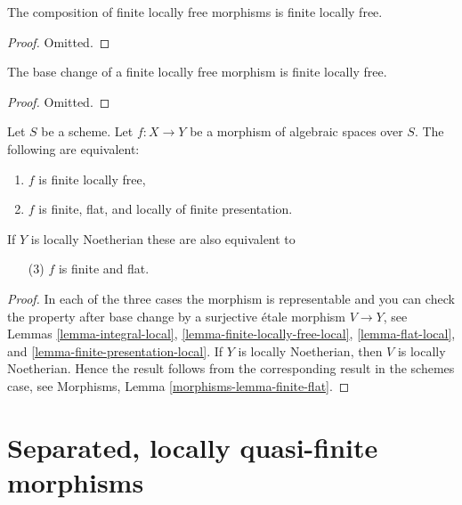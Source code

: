 \begin{lemma}
\label{lemma-composition-finite-locally-free}
The composition of finite locally free morphisms is finite locally free.
\end{lemma}

\begin{proof}
Omitted.
\end{proof}

\begin{lemma}
\label{lemma-base-change-finite-locally-free}
The base change of a finite locally free morphism is finite locally free.
\end{lemma}

\begin{proof}
Omitted.
\end{proof}

\begin{lemma}
\label{lemma-finite-flat}
Let $S$ be a scheme.
Let $f : X \to Y$ be a morphism of algebraic spaces over $S$.
The following are equivalent:
\begin{enumerate}
\item $f$ is finite locally free,
\item $f$ is finite, flat, and locally of finite presentation.
\end{enumerate}
If $Y$ is locally Noetherian these are also equivalent to
\begin{enumerate}
\item[(3)] $f$ is finite and flat.
\end{enumerate}
\end{lemma}

\begin{proof}
In each of the three cases the morphism is representable and you
can check the property after base change by a surjective \'etale morphism
$V \to Y$, see
Lemmas \ref{lemma-integral-local},
\ref{lemma-finite-locally-free-local},
\ref{lemma-flat-local}, and
\ref{lemma-finite-presentation-local}.
If $Y$ is locally Noetherian, then $V$ is locally Noetherian.
Hence the result follows from the corresponding result
in the schemes case, see
Morphisms, Lemma \ref{morphisms-lemma-finite-flat}.
\end{proof}






\section{Separated, locally quasi-finite morphisms}
\label{section-schemehood}

